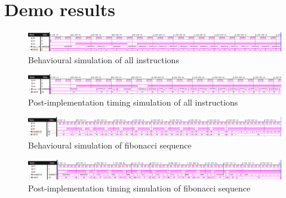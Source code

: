 \documentclass[CMPE]{../KGCOEReport}
\begin{document}
    \section*{Demo results}
    \begin{figure}[h!]
        \centering
        \includegraphics[width=\textwidth]{img/part_a_behav}
        \caption{Behavioural simulation of all instructions}
        \label{fig:demo1}
	\end{figure}
    \begin{figure}[h!]
        \centering
        \includegraphics[width=\textwidth]{img/part_a_impl}
        \caption{Post-implementation timing simulation of all instructions}
        \label{fig:demo1}
	\end{figure}
    \begin{figure}[h!]
        \centering
        \includegraphics[width=\textwidth]{img/part_b_behav}
        \caption{Behavioural simulation of fibonacci sequence}
        \label{fig:demo1}
	\end{figure}
    \begin{figure}[h!]
        \centering
        \includegraphics[width=\textwidth]{img/part_b_impl}
        \caption{Post-implementation timing simulation of fibonacci sequence}
        \label{fig:demo1}
    \end{figure}
\end{document}
